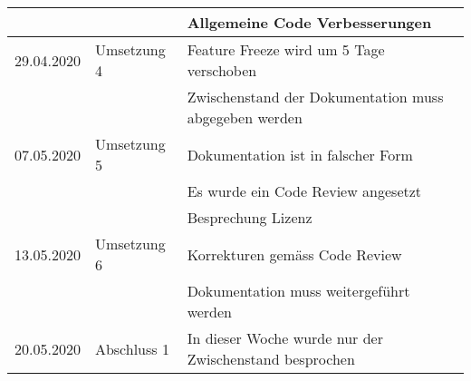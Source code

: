 \documentclass[]{subfiles}
\begin{document}
\begin{tabularx}{\linewidth}{lll}
        & & Allgemeine Code Verbesserungen \\
        \midrule
        29.04.2020 & Umsetzung 4 & Feature Freeze wird um 5 Tage verschoben \\
        & & Zwischenstand der Dokumentation muss abgegeben werden \\
        \midrule
        07.05.2020 & Umsetzung 5 & Dokumentation ist in falscher Form \\
        & & Es wurde ein Code Review angesetzt \\
        & & Besprechung Lizenz\\
        \midrule
        13.05.2020 & Umsetzung 6 & Korrekturen gemäss Code Review \\
        & & Dokumentation muss weitergeführt werden\\
        \midrule
        20.05.2020 & Abschluss 1 & In dieser Woche wurde nur der Zwischenstand besprochen \\
        \bottomrule
    \end{tabularx}
\end{document}

